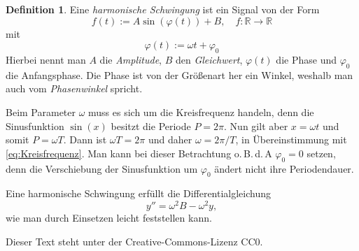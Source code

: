 \documentclass[a4paper,12pt,fleqn,twoside]{article}
\newcommand{\R}{\mathbb R}
\newcommand{\emdef}[1]{\emph{#1}}
\theoremstyle{definition}
\newtheorem{Definition}{Definition}
\theoremstyle{theorem}
\begin{document}
\begin{Definition}
Eine \emdef{harmonische Schwingung} ist ein Signal von der Form
\begin{equation}
f(t) := A\sin(\varphi(t))+B,\quad f\colon\R\to\R
\end{equation}
mit
\begin{equation}
\varphi(t) := \omega t+\varphi_0
\end{equation}
Hierbei nennt man $A$ die \emdef{Amplitude}, $B$ den \emdef{Gleichwert},
$\varphi(t)$ die Phase und $\varphi_0$ die Anfangsphase. Die
Phase ist von der Größenart her ein Winkel, weshalb man auch vom
\emdef{Phasenwinkel} spricht.
\end{Definition}
Beim Parameter $\omega$ muss es sich um die Kreisfrequenz handeln,
denn die Sinusfunktion $\sin(x)$ besitzt die Periode $P=2\pi$.
Nun gilt aber $x=\omega t$ und somit $P=\omega T$. Dann ist
$\omega T=2\pi$ und daher $\omega=2\pi/T$, in Übereinstimmung mit
\eqref{eq:Kreisfrequenz}. Man kann bei dieser Betrachtung
o.\,B.\,d.\,A $\varphi_0=0$ setzen, denn die Verschiebung
der Sinusfunktion um $\varphi_0$ ändert nicht ihre Periodendauer.

Eine harmonische Schwingung erfüllt die Differentialgleichung
\begin{equation}
y'' = \omega^2 B-\omega^2 y,
\end{equation}
wie man durch Einsetzen leicht feststellen kann.


\vfill\noindent
Dieser Text steht unter der Creative-Commons-Lizenz CC0.
\end{document}
